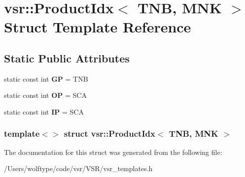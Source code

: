 \hypertarget{structvsr_1_1_product_idx_3_01_t_n_b_00_01_m_n_k_01_4}{\section{vsr\-:\-:Product\-Idx$<$ T\-N\-B, M\-N\-K $>$ Struct Template Reference}
\label{structvsr_1_1_product_idx_3_01_t_n_b_00_01_m_n_k_01_4}
}
\subsection*{Static Public Attributes}
\begin{DoxyCompactItemize}
\item 
\hypertarget{structvsr_1_1_product_idx_3_01_t_n_b_00_01_m_n_k_01_4_a9ad68c18345b5cc48140b8a3f0184050}{static const int {\bfseries G\-P} = T\-N\-B}\label{structvsr_1_1_product_idx_3_01_t_n_b_00_01_m_n_k_01_4_a9ad68c18345b5cc48140b8a3f0184050}

\item 
\hypertarget{structvsr_1_1_product_idx_3_01_t_n_b_00_01_m_n_k_01_4_a86cc5597765ba45bbeb86ae5135408ff}{static const int {\bfseries O\-P} = S\-C\-A}\label{structvsr_1_1_product_idx_3_01_t_n_b_00_01_m_n_k_01_4_a86cc5597765ba45bbeb86ae5135408ff}

\item 
\hypertarget{structvsr_1_1_product_idx_3_01_t_n_b_00_01_m_n_k_01_4_a7e6081a58f9be77668eeaab913d778a5}{static const int {\bfseries I\-P} = S\-C\-A}\label{structvsr_1_1_product_idx_3_01_t_n_b_00_01_m_n_k_01_4_a7e6081a58f9be77668eeaab913d778a5}

\end{DoxyCompactItemize}
\subsubsection*{template$<$$>$ struct vsr\-::\-Product\-Idx$<$ T\-N\-B, M\-N\-K $>$}



The documentation for this struct was generated from the following file\-:\begin{DoxyCompactItemize}
\item 
/\-Users/wolftype/code/vsr/\-V\-S\-R/vsr\-\_\-templates.\-h\end{DoxyCompactItemize}
